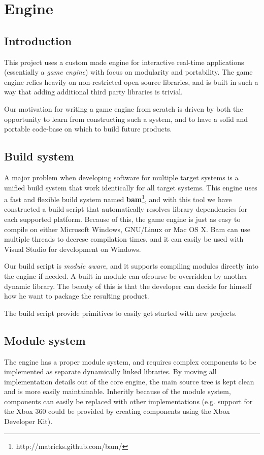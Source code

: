 
\chapter{Engine}
\section {Introduction}
This project uses a custom made engine for interactive real-time applications (essentially a \textit{game engine}) with focus on modularity and portability. The game engine relies heavily on non-restricted open source libraries, and is built in such a way that adding additional third party libraries is trivial.

Our motivation for writing a game engine from scratch is driven by both the opportunity to learn from
constructing such a system, and to have a solid and portable code-base on which to build future products.

\section {Build system}
A major problem when developing software for multiple target systems is a unified build system that work
identically for all target systems. This engine uses a fast and flexible build system named \textbf{bam}\footnote{http://matricks.github.com/bam/}, and
with this tool we have constructed a build script that automatically resolves library dependencies for each supported platform. Because of this, the game engine is just as easy to compile on either Microsoft Windows, GNU/Linux or Mac OS X. Bam can use multiple threads to decrese compilation times, and it can easily be used with Visual Studio for development on Windows.

Our build script is \textit{module aware}, and it supports compiling modules directly into the engine if needed. A built-in module can ofcourse be overridden by another dynamic library. The beauty of this is that the developer can decide for himself how he want to package the resulting product.

The build script provide primitives to easily get started with new projects. 

\newpage

\section{Module system}
The engine has a proper module system, and requires complex components to be implemented as separate dynamically linked libraries. By moving all implementation details out of the core engine, the main source tree is kept clean and is more easily maintainable. Inheritly because of the module system, components can easily be replaced with other implementations (e.g. support for the Xbox 360 could be provided
by creating components using the Xbox Developer Kit).

